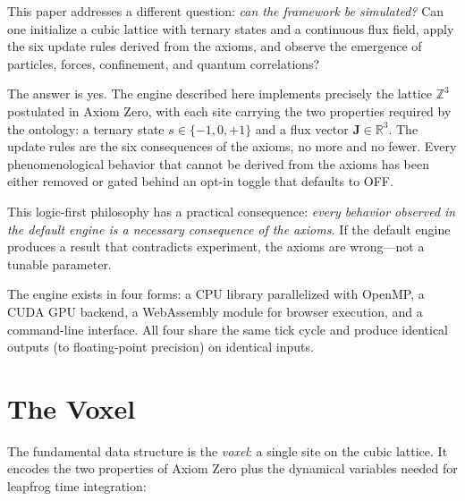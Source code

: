 \documentclass[11pt,a4paper]{article}
\newcommand{\ZZ}{\mathbb{Z}}
\newcommand{\RR}{\mathbb{R}}
\theoremstyle{compact}
\begin{document}
This paper addresses a different question: \emph{can the framework be simulated?} Can one initialize a cubic lattice with ternary states and a continuous flux field, apply the six update rules derived from the axioms, and observe the emergence of particles, forces, confinement, and quantum correlations?

The answer is yes. The engine described here implements precisely the lattice $\ZZ^3$ postulated in Axiom Zero, with each site carrying the two properties required by the ontology: a ternary state $s \in \{-1, 0, +1\}$ and a flux vector $\mathbf{J} \in \RR^3$. The update rules are the six consequences of the axioms, no more and no fewer. Every phenomenological behavior that cannot be derived from the axioms has been either removed or gated behind an opt-in toggle that defaults to OFF.

This logic-first philosophy has a practical consequence: \emph{every behavior observed in the default engine is a necessary consequence of the axioms.} If the default engine produces a result that contradicts experiment, the axioms are wrong---not a tunable parameter.

The engine exists in four forms: a CPU library parallelized with OpenMP, a CUDA GPU backend, a WebAssembly module for browser execution, and a command-line interface. All four share the same tick cycle and produce identical outputs (to floating-point precision) on identical inputs.


\section{The Voxel}
\label{sec:voxel}

The fundamental data structure is the \emph{voxel}: a single site on the cubic lattice. It encodes the two properties of Axiom Zero plus the dynamical variables needed for leapfrog time integration:
\end{document}
